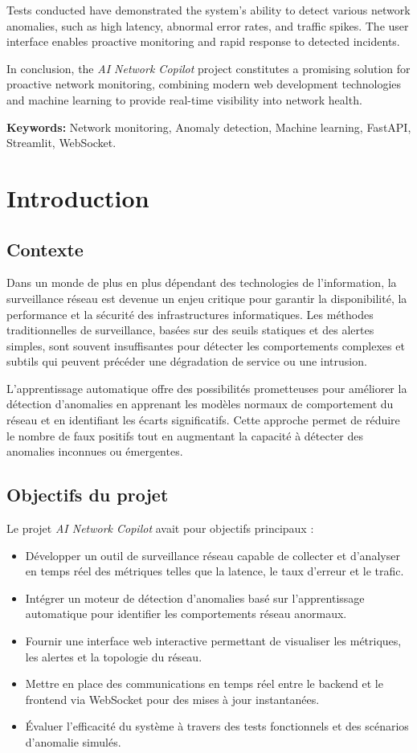 \documentclass[12pt,a4paper]{report}
\begin{document}
Tests conducted have demonstrated the system's ability to detect various network anomalies, such as high latency, abnormal error rates, and traffic spikes. The user interface enables proactive monitoring and rapid response to detected incidents.

In conclusion, the \textit{AI Network Copilot} project constitutes a promising solution for proactive network monitoring, combining modern web development technologies and machine learning to provide real-time visibility into network health.

\textbf{Keywords:} Network monitoring, Anomaly detection, Machine learning, FastAPI, Streamlit, WebSocket.

\tableofcontents
\thispagestyle{empty}

\chapter{Introduction}
\section{Contexte}
Dans un monde de plus en plus dépendant des technologies de l'information, la surveillance réseau est devenue un enjeu critique pour garantir la disponibilité, la performance et la sécurité des infrastructures informatiques. Les méthodes traditionnelles de surveillance, basées sur des seuils statiques et des alertes simples, sont souvent insuffisantes pour détecter les comportements complexes et subtils qui peuvent précéder une dégradation de service ou une intrusion.

L'apprentissage automatique offre des possibilités prometteuses pour améliorer la détection d'anomalies en apprenant les modèles normaux de comportement du réseau et en identifiant les écarts significatifs. Cette approche permet de réduire le nombre de faux positifs tout en augmentant la capacité à détecter des anomalies inconnues ou émergentes.

\section{Objectifs du projet}
Le projet \textit{AI Network Copilot} avait pour objectifs principaux :
\begin{itemize}
    \item Développer un outil de surveillance réseau capable de collecter et d'analyser en temps réel des métriques telles que la latence, le taux d'erreur et le trafic.
    \item Intégrer un moteur de détection d'anomalies basé sur l'apprentissage automatique pour identifier les comportements réseau anormaux.
    \item Fournir une interface web interactive permettant de visualiser les métriques, les alertes et la topologie du réseau.
    \item Mettre en place des communications en temps réel entre le backend et le frontend via WebSocket pour des mises à jour instantanées.
    \item Évaluer l'efficacité du système à travers des tests fonctionnels et des scénarios d'anomalie simulés.
\end{itemize}
\end{document}
